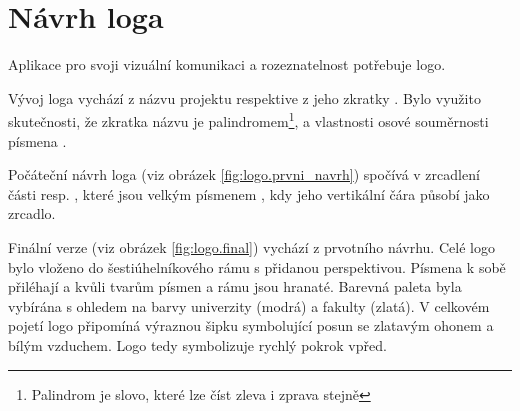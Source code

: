 \documentclass[czech,BP]{thesiskiv}
\begin{document}
	\section{Návrh loga}
	\par Aplikace pro svoji vizuální komunikaci a rozeznatelnost potřebuje logo.
	\par Vývoj loga vychází z názvu projektu  respektive z jeho zkratky . Bylo využito skutečnosti, že zkratka názvu je palindromem\footnote{Palindrom je slovo, které lze číst zleva i zprava stejně}, a vlastnosti osové souměrnosti písmena .
	\par Počáteční návrh loga (viz obrázek \ref{fig:logo.prvni_navrh}) spočívá v zrcadlení části  resp. , které jsou  velkým písmenem , kdy jeho vertikální čára působí jako zrcadlo.
	\par Finální verze (viz obrázek \ref{fig:logo.final}) vychází z prvotního návrhu. Celé logo bylo vloženo do šestiúhelníkového rámu s přidanou perspektivou. Písmena k sobě přiléhají a kvůli tvarům písmen a rámu jsou hranaté. Barevná paleta byla vybírána s ohledem na barvy univerzity (modrá) a fakulty (zlatá). V celkovém pojetí logo připomíná výraznou šipku symbolující posun se zlatavým ohonem a bílým vzduchem. Logo tedy symbolizuje rychlý pokrok vpřed.
\end{document}

